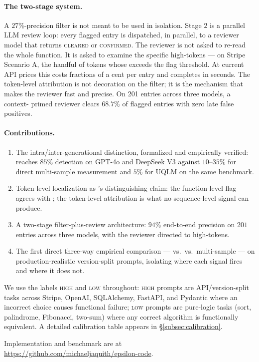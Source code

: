 \paragraph{The two-stage system.}
A $27\%$-precision filter is not meant to be used in isolation. Stage
$2$ is a parallel LLM review loop: every flagged entry is dispatched,
in parallel, to a reviewer model that returns \textsc{cleared} or
\textsc{confirmed}. The reviewer is not asked to re-read the whole
function. It is asked to examine the specific high-\eps tokens --- on
Stripe Scenario A, the handful of tokens whose \eps exceeds the flag
threshold. At current API prices this costs fractions of a cent per
entry and completes in seconds. The token-level attribution is not
decoration on the filter; it is the mechanism that makes the reviewer
fast and precise. On 201 entries across three models, a context-%
primed reviewer clears $68.7\%$ of flagged entries with zero late
false positives.

\paragraph{Contributions.}
\begin{enumerate}[noitemsep]
    \item The intra/inter-generational distinction, formalized and
    empirically verified: \eps reaches $85\%$ detection on GPT-4o and
    DeepSeek V3 against $10$--$35\%$ for direct multi-sample
    measurement and $5\%$ for UQLM on the same benchmark.
    \item Token-level localization as \eps's distinguishing claim:
    the function-level flag agrees with \papg; the token-level
    attribution is what no sequence-level signal can produce.
    \item A two-stage filter-plus-review architecture: $94\%$
    end-to-end precision on $201$ entries across three models, with
    the reviewer directed to high-\eps tokens.
    \item The first direct three-way empirical comparison --- \eps
    vs.\ \papg vs.\ multi-sample --- on production-realistic
    version-split prompts, isolating where each signal fires and
    where it does not.
\end{enumerate}

We use the labels \textsc{high} and \textsc{low} throughout:
\textsc{high} prompts are API/version-split tasks across Stripe,
OpenAI, SQLAlchemy, FastAPI, and Pydantic where an incorrect choice
causes functional failure; \textsc{low} prompts are pure-logic tasks
(sort, palindrome, Fibonacci, two-sum) where any correct algorithm
is functionally equivalent. A detailed calibration table appears in
\S\ref{subsec:calibration}.

Implementation and benchmark are at
\url{https://github.com/michaeljaquith/epsilon-code}.
